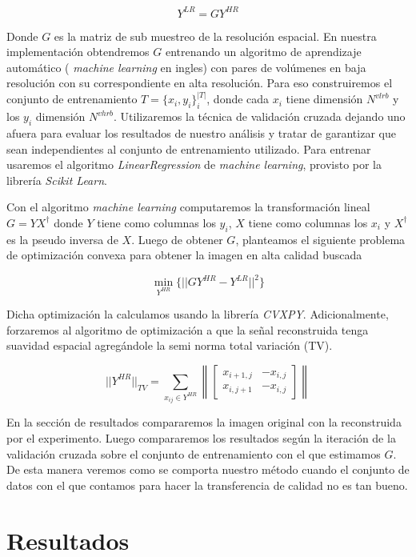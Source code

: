 \documentclass[a4paper,10pt]{article}%
\begin{document}
$$  Y^{LR} = GY^{HR} $$

Donde $G$ es la matriz de sub muestreo de la resolución espacial. En 
nuestra implementación obtendremos $G$ entrenando un algoritmo de aprendizaje automático ( \textit{machine learning} en 
ingles) con pares de volúmenes en baja resolución con su correspondiente en alta resolución. Para eso construiremos el 
conjunto de entrenamiento $T=\{x_i, y_i\}_{i}^{|T|}$, donde cada $x_i$ tiene dimensión $N^{vlrb}$ y los $y_i$ 
dimensión $N^{vhrb}$. Utilizaremos la técnica de validación cruzada dejando uno afuera para evaluar los resultados de 
nuestro análisis y tratar de garantizar que sean independientes al conjunto de entrenamiento utilizado. Para 
entrenar usaremos el algoritmo \textit{LinearRegression} de \textit{machine learning}, provisto por la librería 
\textit{Scikit Learn}.


Con el algoritmo \textit{machine learning} computaremos la transformación lineal $G=YX^{\dagger}$ donde $Y$ tiene como 
columnas los $y_i$, $X$ tiene como columnas los $x_i$ y $X^{\dagger}$ es la pseudo inversa de $X$.
Luego de obtener $G$, planteamos el siguiente problema de optimización convexa para obtener la imagen en alta calidad 
buscada

$$  \min_{Y^{HR}} \{ || G Y^{HR} - Y^{LR} ||^2  \}$$

Dicha optimización la calculamos usando la librería \textit{CVXPY}.
Adicionalmente, forzaremos al algoritmo de optimización a que la señal reconstruida tenga suavidad espacial agregándole 
la semi norma total variación (TV).

$$ ||Y^{HR}||_{TV} = \sum_{x_{ij} \in Y^{HR}} \left\| \left[  \begin{array}{ccc}
x_{i+1,j}  & -x_{i,j} \\
x_{i,j+1}  & -x_{i,j} \end{array} \right]  \right\|$$

En la sección de resultados compararemos la imagen original con la reconstruida por el 
experimento. Luego compararemos los resultados según la iteración de la validación cruzada sobre el conjunto de 
entrenamiento con el que estimamos $G$. De esta manera veremos como se comporta nuestro m\'etodo cuando el conjunto de 
datos con el que contamos para hacer la transferencia de calidad no es tan bueno.

\section{Resultados}
\end{document}
